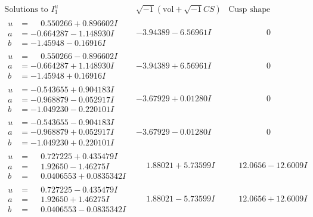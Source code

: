 \documentclass[1p]{elsarticle_modified}
\theoremstyle{definition}
\newcommand{\I}{\sqrt{-1}}
\begin{document}
$$\begin{array}{c|c|c}  
\text{Solutions to }I^u_{1}& \I (\text{vol} + \sqrt{-1}CS) & \text{Cusp shape}\\
 \hline 
\begin{aligned}
u &= \phantom{-}0.550266 + 0.896602 I \\
a &= -0.664287 - 1.148930 I \\
b &= -1.45948 - 0.16916 I\end{aligned}
 & -3.94389 - 6.56961 I & \phantom{-0.000000 } 0 \\ \hline\begin{aligned}
u &= \phantom{-}0.550266 - 0.896602 I \\
a &= -0.664287 + 1.148930 I \\
b &= -1.45948 + 0.16916 I\end{aligned}
 & -3.94389 + 6.56961 I & \phantom{-0.000000 } 0 \\ \hline\begin{aligned}
u &= -0.543655 + 0.904183 I \\
a &= -0.968879 - 0.052917 I \\
b &= -1.049230 - 0.220101 I\end{aligned}
 & -3.67929 + 0.01280 I & \phantom{-0.000000 } 0 \\ \hline\begin{aligned}
u &= -0.543655 - 0.904183 I \\
a &= -0.968879 + 0.052917 I \\
b &= -1.049230 + 0.220101 I\end{aligned}
 & -3.67929 - 0.01280 I & \phantom{-0.000000 } 0 \\ \hline\begin{aligned}
u &= \phantom{-}0.727225 + 0.435479 I \\
a &= \phantom{-}1.92650 - 1.46275 I \\
b &= \phantom{-}0.0406553 + 0.0835342 I\end{aligned}
 & \phantom{-}1.88021 + 5.73599 I & \phantom{-}12.0656 - 12.6009 I \\ \hline\begin{aligned}
u &= \phantom{-}0.727225 - 0.435479 I \\
a &= \phantom{-}1.92650 + 1.46275 I \\
b &= \phantom{-}0.0406553 - 0.0835342 I\end{aligned}
 & \phantom{-}1.88021 - 5.73599 I & \phantom{-}12.0656 + 12.6009 I \\ \hline\begin{aligned}

\end{aligned}
\end{array}$$
\end{document}
